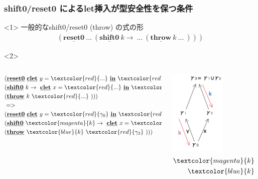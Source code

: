 \documentclass[dvipdfmx,cjk,xcolor=dvipsnames,envcountsect,notheorems,12pt]{beamer}
\newcommand\cResetz{\underline{\textbf{reset0}}}
\newcommand\cShiftz{\underline{\textbf{shift0}}}
\newcommand\cThrow{\underline{\textbf{throw}}}
\newcommand\cLet{\underline{\textbf{clet}}}
\newcommand\cIn{\underline{\textbf{in}}}
\newcommand\codeT[2]{\langle{#1}\rangle^{#2}}
\newcommand\contT[2]{({#1} \Rightarrow {#2})}
\newcommand\red[1]{\textcolor{red}{#1}}
\newcommand\magenta[1]{\textcolor{magenta}{#1}}
\newcommand\blue[1]{\textcolor{blue}{#1}}
\theoremstyle{definition}
\begin{document}
\begin{frame}
  \frametitle{shift0/reset0 によるlet挿入が型安全性を保つ条件}
  \begin{onlyenv}<1>
    一般的なshift0/reset0 (throw) の式の形
    \begin{align*}
      (\cResetz ~...~ (\cShiftz ~k \to ~...~ (\cThrow ~k ~...~)))
    \end{align*}
  \end{onlyenv}


  \begin{onlyenv}<2>
    \begin{columns}
      \begin{column}{0.5\textwidth}%
        \begin{align*}
          &(\cResetz ~\cLet~ y = \red{...} ~\cIn~ \red{...} \\
          &(\cShiftz ~k \to ~\cLet~ x = \red{...} ~\cIn~ \red{...}\\
          &(\cThrow ~k ~\red{...}~)))\\
          &=> \\
          &(\cResetz ~\cLet~ y = \red{\gamma_0} ~\cIn~ \red{\gamma_1} \\
          &(\cShiftz ~\magenta{k} \to ~\cLet~ x = \red{\gamma_1} ~\cIn~ \red{\gamma_2} \\
          &(\cThrow ~\blue{k} ~\red{\gamma_3}~)))
        \end{align*}
      \end{column}

      \begin{column}{0.5\textwidth}%
        \center
        \includegraphics[clip,height=4cm]{./img/index.png}
        \begin{align*}
          \magenta{k} ~:~ \contT{\codeT{\cdot}{\gamma_1}}{\codeT{\cdot}{\gamma_0}}\\
          \blue{k} ~:~  \contT{\codeT{\cdot}{\gamma_3}}{\codeT{\cdot}{\gamma_2}}\\
        \end{align*}
      \end{column}
    \end{columns}
  \end{onlyenv}

\end{frame}
\end{document}
